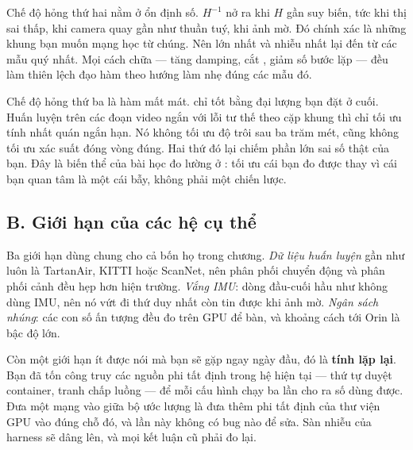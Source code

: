 \documentclass[../../deep_learning.tex]{subfiles}
\begin{document}
Chế độ hỏng thứ hai nằm ở ổn định số. \(H^{-1}\) nở ra khi \(H\) gần suy biến, tức khi thị sai thấp, khi camera quay gần như thuần tuý, khi ảnh mờ. Đó chính xác là những khung bạn muốn mạng học từ chúng. Nên  lớn nhất và nhiễu nhất lại đến từ các mẫu quý nhất. Mọi cách chữa --- tăng damping, cắt , giảm số bước lặp --- đều làm thiên lệch đạo hàm theo hướng làm nhẹ đúng các mẫu đó.

Chế độ hỏng thứ ba là hàm mất mát.  chỉ tốt bằng đại lượng bạn đặt ở cuối. Huấn luyện trên các đoạn video ngắn với lỗi tư thế theo cặp khung thì chỉ tối ưu tính nhất quán ngắn hạn. Nó không tối ưu độ trôi sau ba trăm mét, cũng không tối ưu xác suất đóng vòng đúng. Hai thứ đó lại chiếm phần lớn sai số thật của bạn. Đây là biến thể của bài học đo lường ở : tối ưu cái bạn đo được thay vì cái bạn quan tâm là một cái bẫy, không phải một chiến lược.

\subsection{B. Giới hạn của các hệ cụ thể}
Ba giới hạn dùng chung cho cả bốn họ trong chương. \emph{Dữ liệu huấn luyện} gần như luôn là TartanAir, KITTI hoặc ScanNet, nên phân phối chuyển động và phân phối cảnh đều hẹp hơn hiện trường. \emph{Vắng IMU}: dòng đầu-cuối hầu như không dùng IMU, nên nó vứt đi thứ duy nhất còn tin được khi ảnh mờ. \emph{Ngân sách nhúng}: các con số ấn tượng đều đo trên GPU để bàn, và khoảng cách tới Orin là bậc độ lớn.

Còn một giới hạn ít được nói mà bạn sẽ gặp ngay ngày đầu, đó là \textbf{tính lặp lại}. Bạn đã tốn công truy các nguồn phi tất định trong hệ hiện tại --- thứ tự duyệt container, tranh chấp luồng --- để mỗi cấu hình chạy ba lần cho ra số dùng được. Đưa một mạng vào giữa bộ ước lượng là đưa thêm phi tất định của thư viện GPU vào đúng chỗ đó, và lần này không có bug nào để sửa. Sàn nhiễu của harness sẽ dâng lên, và mọi kết luận cũ phải đo lại.
\end{document}
